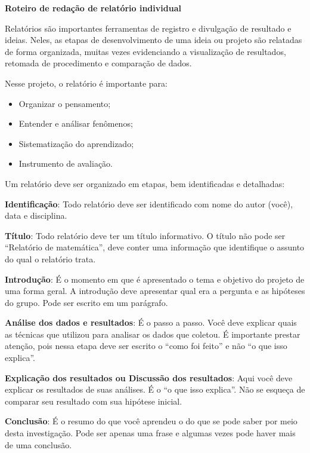 \cleardoublepage
{}\label{relatorio-individual}
\centering
\textbf{\Large\color{\currentcolor} Roteiro de redação de relatório individual}
\justify

Relatórios são importantes ferramentas de registro e divulgação de resultado e ideias. Neles, as etapas de desenvolvimento de uma ideia ou projeto são relatadas de forma organizada, muitas vezes evidenciando a visualização de resultados, retomada de procedimento e comparação de dados. 

Nesse projeto, o relatório é importante para:

\begin{itemize}
\item Organizar o pensamento;
\item Entender e análisar fenômenos;
\item Sistematização do aprendizado;
\item Instrumento de avaliação.
\end{itemize}

Um relatório  deve ser organizado em etapas, bem identificadas e detalhadas:
\setlength\parskip{1.5em}

\noindent\textbf{Identificação}: Todo relatório deve ser identificado com nome do autor (você), data e disciplina.

\noindent\textbf{Título}: Todo relatório deve ter um título informativo. O título não pode ser “Relatório de matemática”, deve conter uma informação que identifique o assunto do qual o relatório trata.

\noindent\textbf{Introdução}: É o momento em que é apresentado o tema e objetivo do projeto de uma forma geral. A introdução deve apresentar qual era a pergunta e as hipóteses do grupo. Pode ser escrito em um parágrafo.

\noindent\textbf{Análise dos dados e resultados}:  É o passo a passo. Você deve explicar quais as técnicas que utilizou para analisar os dados que coletou. É importante prestar atenção, pois nessa etapa deve ser escrito o “como foi feito” e não “o que isso explica”. 

\noindent\textbf{Explicação dos resultados ou Discussão dos resultados}: Aqui você deve explicar os resultados de suas análises. É o “o que isso explica”.  Não se esqueça de comparar seu resultado com sua hipótese inicial.

\noindent\textbf{Conclusão}: É o resumo do que você aprendeu o do que se pode saber por meio  desta investigação. Pode ser apenas uma frase e algumas vezes pode haver mais de uma conclusão.

